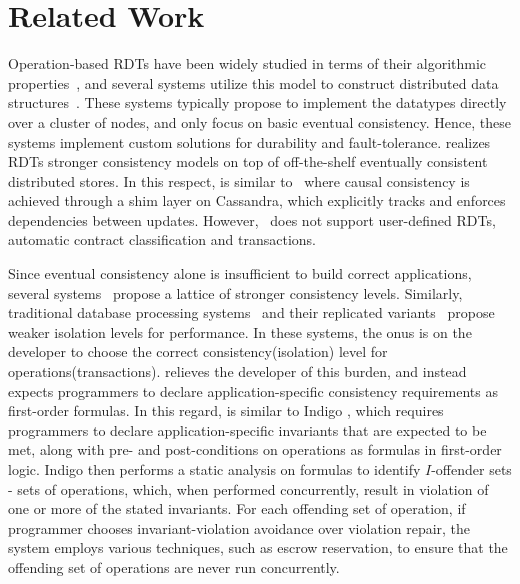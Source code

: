 \section{Related Work}
\label{sec:related}

Operation-based RDTs have been widely studied in terms of their algorithmic
properties~\cite{SSS,Burckhardt2014}, and several systems utilize this model to
construct distributed data structures~\cite{Cassandra,Bayou,Tango}. These
systems typically propose to implement the datatypes directly over a cluster of
nodes, and only focus on basic eventual consistency. Hence, these systems
implement custom solutions for durability and fault-tolerance. \name realizes
RDTs stronger consistency models on top of off-the-shelf eventually consistent
distributed stores. In this respect, \name is similar to~\cite{BoltOn} where
causal consistency is achieved through a shim layer on Cassandra, which
explicitly tracks and enforces dependencies between updates.
However,~\cite{BoltOn} does not support user-defined RDTs, automatic contract
classification and transactions.

Since eventual consistency alone is insufficient to build correct applications,
several systems~\cite{Bayou,Pileus,RedBlue} propose a lattice of stronger
consistency levels. Similarly, traditional database processing
systems~\cite{Berenson95} and their replicated variants~\cite{BailisHAT}
propose weaker isolation levels for performance. In these systems, the onus is
on the developer to choose the correct consistency(isolation) level for
operations(transactions). \name relieves the developer of this burden, and
instead expects programmers to declare application-specific consistency
requirements as first-order formulas. In this regard, \name is similar to Indigo
\cite{indigo}, which requires programmers to declare application-specific
invariants that are expected to be met, along with pre- and post-conditions on
operations as formulas in first-order logic. Indigo then performs a static
analysis on formulas to identify $I$-offender sets - sets of operations,
which, when performed concurrently, result in violation of one or more of the
stated invariants. For each offending set of operation, if programmer chooses 
invariant-violation avoidance over violation repair, the system employs various
techniques, such as escrow reservation, to ensure that the offending set of
operations are never run concurrently.

